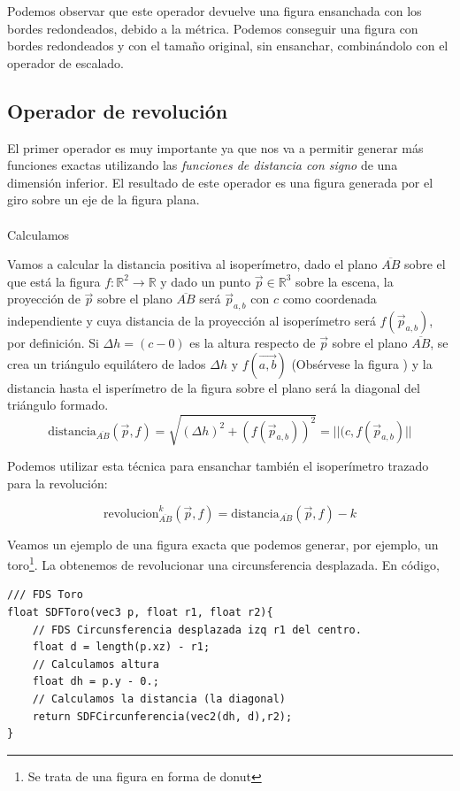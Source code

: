 Podemos observar que este operador devuelve una figura ensanchada con los bordes redondeados, debido a la métrica. Podemos conseguir una figura con bordes redondeados y con el tamaño original, sin ensanchar, combinándolo con el operador de escalado.

\subsection{Operador de revolución}
El primer operador es muy importante ya que nos va a permitir generar más funciones exactas utilizando las \textit{funciones de distancia con signo} de una dimensión inferior. El resultado de este operador es una figura generada por el giro sobre un eje de la figura plana.\\\\
Calculamos  

Vamos a calcular la distancia positiva al isoperímetro, dado el plano \(\overline{AB}\) sobre el que está la figura \(f:\mathbb{R}^2\longrightarrow\mathbb{R}\) y dado un punto \(\Vec{p}\in\mathbb{R}^3\) sobre la escena, la proyección de \(\Vec{p}\) sobre el plano \(\overline{AB}\) será \(\Vec{p}_{a,b}\) con \(c\) como coordenada independiente y cuya distancia de la proyección al isoperímetro será \(f(\Vec{p}_{a,b})\), por definición. Si \(\Delta h=(c-0)\) es la altura respecto de \(\Vec{p}\) sobre el plano \(\overline{AB}\), se crea un triángulo equilátero de lados \(\Delta h\) y \( f(\Vec{a,b})\) (Obsérvese la figura ) y la distancia  hasta el isperímetro de la figura sobre el plano será la diagonal del triángulo formado.
\[\text{distancia}_{\overline{AB}}(\Vec{p}, f)= \sqrt{(\Delta h)^2+(f(\Vec{p}_{a,b}))^2}=\vert\vert(c, f(\Vec{p}_{a,b})\vert\vert\]

Podemos utilizar esta técnica para ensanchar también el isoperímetro trazado para la revolución:

\[\text{revolucion}_{\overline{AB}}^k(\Vec{p}, f)=\text{distancia}_{\overline{AB}}(\Vec{p}, f)-k\]

Veamos un ejemplo de una figura exacta que podemos generar, por ejemplo, un toro\footnote{Se trata de una figura en forma de donut}. La obtenemos de revolucionar una circunsferencia desplazada. En código,

\begin{lstlisting}
/// FDS Toro
float SDFToro(vec3 p, float r1, float r2){
    // FDS Circunsferencia desplazada izq r1 del centro.
    float d = length(p.xz) - r1;
    // Calculamos altura
    float dh = p.y - 0.;
    // Calculamos la distancia (la diagonal)
    return SDFCircunferencia(vec2(dh, d),r2);
}
\end{lstlisting}

